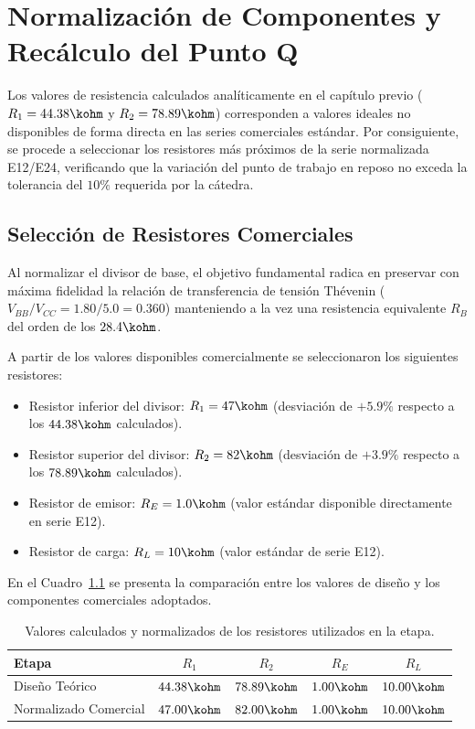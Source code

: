 \chapter{Normalización de Componentes y Recálculo del Punto Q}
\label{chap:normalizacion}

Los valores de resistencia calculados analíticamente en el capítulo previo ($R_1 = 44.38\kohm$ y $R_2 = 78.89\kohm$)
corresponden a valores ideales no disponibles de forma directa en las series comerciales estándar. Por consiguiente,
se procede a seleccionar los resistores más próximos de la serie normalizada E12/E24, verificando que la variación del
punto de trabajo en reposo no exceda la tolerancia del $10\%$ requerida por la cátedra.

\section{Selección de Resistores Comerciales}

Al normalizar el divisor de base, el objetivo fundamental radica en preservar con máxima fidelidad la relación
de transferencia de tensión Thévenin ($V_{BB}/V_{CC} = 1.80/5.0 = 0.360$) manteniendo a la vez una resistencia
equivalente $R_B$ del orden de los $28.4\kohm$.

A partir de los valores disponibles comercialmente se seleccionaron los siguientes resistores:
\begin{itemize}
  \item Resistor inferior del divisor: $R_1 = 47\kohm$ (desviación de $+5.9\%$ respecto a los $44.38\kohm$ calculados).
  \item Resistor superior del divisor: $R_2 = 82\kohm$ (desviación de $+3.9\%$ respecto a los $78.89\kohm$ calculados).
  \item Resistor de emisor: $R_E = 1.0\kohm$ (valor estándar disponible directamente en serie E12).
  \item Resistor de carga: $R_L = 10\kohm$ (valor estándar de serie E12).
\end{itemize}

En el Cuadro~\ref{tab:resistores_normalizados} se presenta la comparación entre los valores de diseño y los componentes
comerciales adoptados.

\begin{table}[!ht]
  \centering
  \begin{tabular}{|l|c|c|c|c|}
    \hline
    \textbf{Etapa} & $R_1$ & $R_2$ & $R_E$ & $R_L$ \\
    \hline
    Diseño Teórico & $44.38\kohm$ & $78.89\kohm$ & $1.00\kohm$ & $10.00\kohm$ \\
    Normalizado Comercial & $47.00\kohm$ & $82.00\kohm$ & $1.00\kohm$ & $10.00\kohm$ \\
    \hline
  \end{tabular}
  \caption{Valores calculados y normalizados de los resistores utilizados en la etapa.}
  \label{tab:resistores_normalizados}
\end{table}

